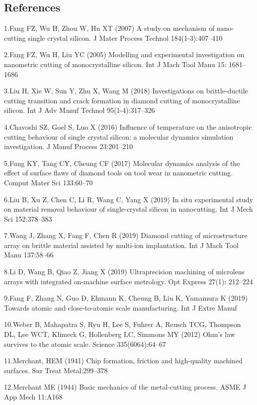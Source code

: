 \documentclass{article}
\begin{document}
\subsection*{References}
\begin{hangpars}\small
1.\quad Fang FZ, Wu H, Zhou W, Hu XT (2007) A study on mechanism of nano-cutting single crystal silicon. J Mater Process Technol 184(1-3):407–410

2.\quad Fang FZ, Wu H, Liu YC (2005) Modelling and experimental investigation on nanometric cutting of monocrystalline silicon. Int J Mach Tool Manu 15: 1681–1686

3.\quad Liu H, Xie W, Sun Y, Zhu X, Wang M (2018) Investigations on brittle-ductile cutting transition and crack formation in diamond cutting of monocrystalline silicon. Int J Adv Manuf Technol 95(1-4):317–326

4.\quad Chavoshi SZ, Goel S, Luo X (2016) Influence of temperature on the anisotropic cutting behaviour of single crystal silicon: a molecular dynamics simulation investigation. J Manuf Process 23:201–210

5.\quad Fung KY, Tang CY, Cheung CF (2017) Molecular dynamics analysis of the effect of surface flaws of diamond tools on tool wear in nanometric cutting. Comput Mater Sci 133:60–70

6.\quad Liu B, Xu Z, Chen C, Li R, Wang C, Yang X (2019) In situ experimental study on material removal behaviour of single-crystal silicon in nanocutting. Int J Mech Sci 152:378–383

7.\quad Wang J, Zhang X, Fang F, Chen R (2019) Diamond cutting of microstructure array on brittle material assisted by multi-ion implantation. Int J Mach Tool Manu 137:58–66

8.\quad Li D, Wang B, Qiao Z, Jiang X (2019) Ultraprecision machining of microlens arrays with integrated on-machine surface metrology. Opt Express 27(1): 212–224

9.\quad Fang F, Zhang N, Guo D, Ehmann K, Cheung B, Liu K, Yamamura K (2019) Towards atomic and close-to-atomic scale manufacturing. Int J Extre Manuf

10.\quad Weber B, Mahapatra S, Ryu H, Lee S, Fuhrer A, Reusch TCG, Thompson DL, Lee WCT, Klimeck G, Hollenberg LC, Simmons MY (2012) Ohm’s law survives to the atomic scale. Science 335(6064):64–67

11.\quad Merchant, HEM (1941) Chip formation, friction and high-quality machined surfaces. Sur Treat Metal:299–378

12.\quad Merchant ME (1944) Basic mechanics of the metal-cutting process. ASME J App Mech 11:A168


\end{hangpars}
\end{document}
